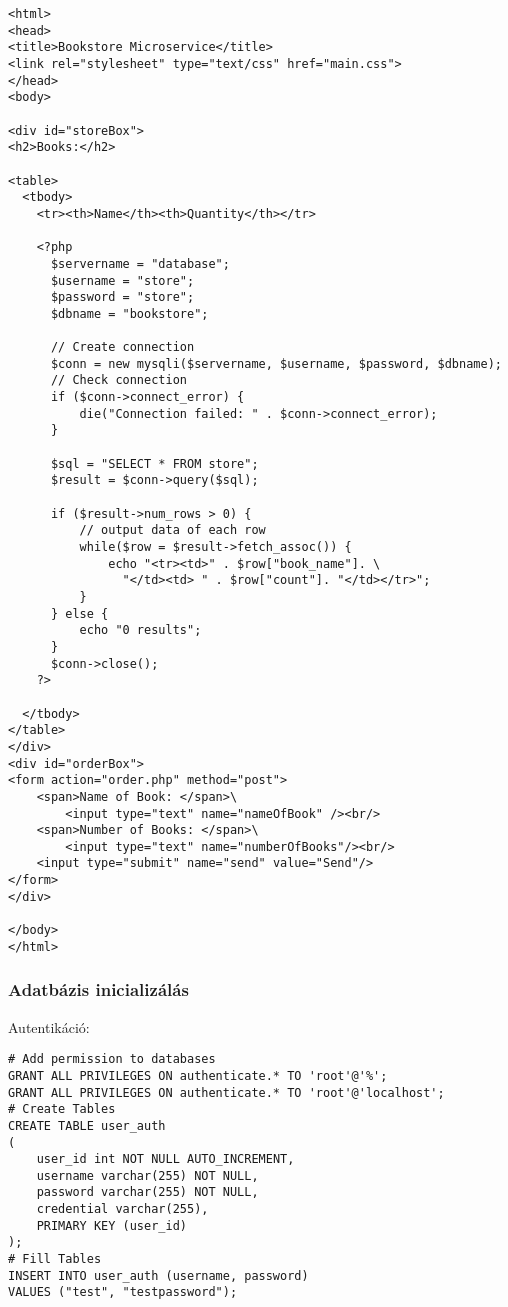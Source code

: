 \begin{verbatim}
<html>
<head>
<title>Bookstore Microservice</title>
<link rel="stylesheet" type="text/css" href="main.css">
</head>
<body>

<div id="storeBox">
<h2>Books:</h2>

<table>
  <tbody>
    <tr><th>Name</th><th>Quantity</th></tr>

    <?php
      $servername = "database";
      $username = "store";
      $password = "store";
      $dbname = "bookstore";

      // Create connection
      $conn = new mysqli($servername, $username, $password, $dbname);
      // Check connection
      if ($conn->connect_error) {
          die("Connection failed: " . $conn->connect_error);
      }

      $sql = "SELECT * FROM store";
      $result = $conn->query($sql);

      if ($result->num_rows > 0) {
          // output data of each row
          while($row = $result->fetch_assoc()) {
              echo "<tr><td>" . $row["book_name"]. \
                "</td><td> " . $row["count"]. "</td></tr>";
          }
      } else {
          echo "0 results";
      }
      $conn->close();
    ?>

  </tbody>
</table>
</div>
<div id="orderBox">
<form action="order.php" method="post">
    <span>Name of Book: </span>\
        <input type="text" name="nameOfBook" /><br/>
    <span>Number of Books: </span>\
        <input type="text" name="numberOfBooks"/><br/>
    <input type="submit" name="send" value="Send"/>
</form>
</div>

</body>
</html>
\end{verbatim}

\subsubsection{\texorpdfstring{Adatbázis
inicializálás\label{appendix-database}}{Adatbázis inicializálás}}\label{adatbuxe1zis-inicializuxe1luxe1s}

Autentikáció:

\begin{verbatim}
# Add permission to databases
GRANT ALL PRIVILEGES ON authenticate.* TO 'root'@'%';
GRANT ALL PRIVILEGES ON authenticate.* TO 'root'@'localhost';
# Create Tables
CREATE TABLE user_auth
(
    user_id int NOT NULL AUTO_INCREMENT,
    username varchar(255) NOT NULL,
    password varchar(255) NOT NULL,
    credential varchar(255),
    PRIMARY KEY (user_id)
);
# Fill Tables
INSERT INTO user_auth (username, password)
VALUES ("test", "testpassword");
\end{verbatim}

